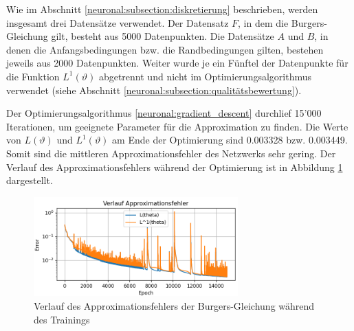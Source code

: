 Wie im Abschnitt \ref{neuronal:subsection:diskretierung} beschrieben, werden insgesamt drei Datensätze verwendet.
Der Datensatz \( F \), in dem die Burgers-Gleichung gilt, besteht aus 5000 Datenpunkten.
Die Datensätze \( A \) und \( B \), in denen die Anfangsbedingungen bzw. die Randbedingungen gilten, bestehen jeweils aus 2000 Datenpunkten.
Weiter wurde je ein Fünftel der Datenpunkte für die Funktion \( L^1(\vartheta) \) abgetrennt und nicht im Optimierungsalgorithmus verwendet (siehe Abschnitt \ref{neuronal:subsection:qualitätsbewertung}).

Der Optimierungsalgorithmus \ref{neuronal:gradient_descent} durchlief 15'000 Iterationen, um geeignete Parameter für die Approximation zu finden.
Die Werte von \( L(\vartheta) \) und \( L^1(\vartheta) \) am Ende der Optimierung sind 0.003328 bzw. 0.003449.
Somit sind die mittleren Approximationsfehler des Netzwerks sehr gering.
Der Verlauf des Approximationsfehlers während der Optimierung ist in Abbildung \ref{fig:fehler_burgers} dargestellt.
\begin{figure}
    \centering
    \hspace*{-0.1\textwidth}
    \includegraphics[width=0.7\textwidth]{papers/neuronal/images/approximation_error_burgers.png}
    \caption{Verlauf des Approximationsfehlers der Burgers-Gleichung während des Trainings}
    \label{fig:fehler_burgers}
\end{figure}

